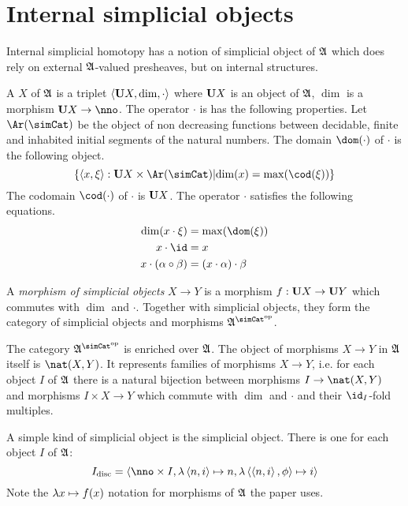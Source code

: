 \documentclass[csh.tex]{subfiles}
\begin{document}
\section{Internal simplicial objects}
Internal simplicial homotopy has a notion of simplicial object of $\mathfrak A$ which does rely on external $\mathfrak A$-valued presheaves, but on internal structures.

\begin{definition} A  $X$ of $\mathfrak A$ is a triplet $\left\langle \mathbf{U} X, \dim, \cdot \right\rangle$ where $\mathbf{U} X$ is an object of $\mathfrak A$, $\dim$ is a morphism $\base X\to \nno$. The operator $\cdot$ is has the following properties. Let $\Ar(\simCat)$ be the object of non decreasing functions between decidable, finite and inhabited initial segments of the natural numbers. The domain $\dom(\cdot)$ of $\cdot$ is the following object. 
\[ \set{\tuplet{x,\xi}\of \base X\times \Ar(\simCat)\middle| \dim(x) = \max(\cod(\xi))}\]
The codomain $\cod(\cdot)$ of $\cdot$ is $\mathbf{U} X$. The operator $\cdot$ satisfies the following equations.
\begin{align*}
\dim(x\cdot\xi) &= \max(\dom(\xi))\\
x\cdot \id &= x \\
x\cdot(\alpha\circ\beta)&=(x\cdot\alpha)\cdot\beta 
\end{align*}

A \emph{morphism of simplicial objects} $X\to Y$ is a morphism $f:\mathbf{U} X\to\mathbf{U} Y$ which commutes with $\dim$ and $\cdot$. Together with simplicial objects, they form the category of simplicial objects and morphisms $\ambient\s$.

The category $\ambient\s$ is enriched over $\mathfrak A$. The object of morphisms $X\to Y$ in $\mathfrak A$ itself is $\nat(X,Y)$. It represents families of morphisms $X\to Y$, i.e. for each object $I$ of $\mathfrak A$ there is a natural bijection between morphisms $I\to \nat(X,Y)$ and morphisms $I\times X\to Y$ which commute with $\dim$ and $\cdot$ and their $\id_I$-fold multiples.
\end{definition}

\begin{example} A simple kind of simplicial object is the  simplicial object. There is one for each object $I$ of $\mathfrak A$: 
\[ I\disc = \tuplet{\nno\times I,\function{\tuplet{n,i}}n,\function{\tuplet{\tuplet{n,i},\phi}}i} \]
Note the $\lambda x \mapsto f(x)$ notation for morphisms of $\mathfrak A$ the paper uses.
\end{example}
\end{document}
